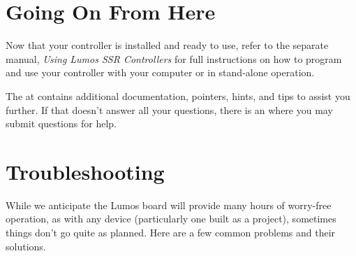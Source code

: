 \documentclass[letterpaper,twoside,onecolumn,openright,final]{memoir}
\begin{document}
\chapter{Going On From Here}
Now that your controller is installed and ready to use, refer to the separate manual,
\emph{Using Lumos SSR Controllers} for full instructions on how to program
and use your controller with your computer or in stand-alone operation.

The  at  contains additional documentation,
pointers, hints, and tips to assist you further.  If that doesn't answer all your questions,
there is an  where you may submit questions for help.

\backmatter
\appendix
\renewcommand\thechapter{A}



\chapter{Troubleshooting}\label{ch:troubleshooting}
While we anticipate the Lumos board will provide many hours of worry-free operation,
as with any device (particularly one built as a  project), sometimes things don't go
quite as planned.  Here are a few common problems and their solutions.
\end{document}
